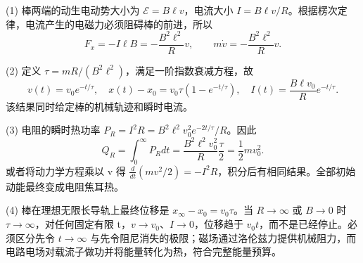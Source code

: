 (1) 棒两端的动生电动势大小为 \(\mathcal E=B\ell v\)，电流大小 \(I=B\ell v/R\)。根据楞次定律，电流产生的电磁力必须阻碍棒的前进，所以
\[
F_x=-I\ell B=-\frac{B^2\ell^2}{R}v,\qquad
m\dot v=-\frac{B^2\ell^2}{R}v.
\]

(2) 定义 \(\tau=mR/(B^2\ell^2)\)，满足一阶指数衰减方程，故
\[
v(t)=v_0e^{-t/\tau},\quad
x(t)-x_0=v_0\tau(1-e^{-t/\tau}),\quad
I(t)=\frac{B\ell v_0}{R}e^{-t/\tau}.
\]
该结果同时给定棒的机械轨迹和瞬时电流。

(3) 电阻的瞬时热功率 \(P_R=I^2R=B^2\ell^2v_0^2e^{-2t/\tau}/R\)。因此
\[
Q_R=\int_0^\infty P_Rdt
=\frac{B^2\ell^2v_0^2}{R}\frac{\tau}{2}
=\frac12mv_0^2.
\]
或者将动力学方程乘以 v 得 \(\frac d{dt}(mv^2/2)=-I^2R\)，积分后有相同结果。全部初始动能最终变成电阻焦耳热。

(4) 棒在理想无限长导轨上最终位移是 \(x_\infty-x_0=v_0\tau\)。当 \(R\to \infty \) 或 \(B\to 0\) 时 \(\tau \to \infty \)，对任何固定有限 t，\(v\to v_0\)、\(I\to0\)，位移趋于 \(v_{0}t\)，而不是已经停止。必须区分先令 \(t\to \infty \) 与先令阻尼消失的极限；磁场通过洛伦兹力提供机械阻力，而电路电场对载流子做功并将能量转化为热，符合完整能量预算。
